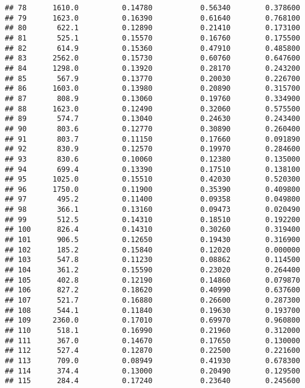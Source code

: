 \documentclass[
]{article}
\begin{document}
\begin{verbatim}
## 78      1610.0          0.14780           0.56340        0.378600
## 79      1623.0          0.16390           0.61640        0.768100
## 80       622.1          0.12890           0.21410        0.173100
## 81       525.1          0.15570           0.16760        0.175500
## 82       614.9          0.15360           0.47910        0.485800
## 83      2562.0          0.15730           0.60760        0.647600
## 84      1298.0          0.13920           0.28170        0.243200
## 85       567.9          0.13770           0.20030        0.226700
## 86      1603.0          0.13980           0.20890        0.315700
## 87       808.9          0.13060           0.19760        0.334900
## 88      1623.0          0.12490           0.32060        0.575500
## 89       574.7          0.13040           0.24630        0.243400
## 90       803.6          0.12770           0.30890        0.260400
## 91       803.7          0.11150           0.17660        0.091890
## 92       830.9          0.12570           0.19970        0.284600
## 93       830.6          0.10060           0.12380        0.135000
## 94       699.4          0.13390           0.17510        0.138100
## 95      1025.0          0.15510           0.42030        0.520300
## 96      1750.0          0.11900           0.35390        0.409800
## 97       495.2          0.11400           0.09358        0.049800
## 98       366.1          0.13160           0.09473        0.020490
## 99       512.5          0.14310           0.18510        0.192200
## 100      826.4          0.14310           0.30260        0.319400
## 101      906.5          0.12650           0.19430        0.316900
## 102      185.2          0.15840           0.12020        0.000000
## 103      547.8          0.11230           0.08862        0.114500
## 104      361.2          0.15590           0.23020        0.264400
## 105      402.8          0.12190           0.14860        0.079870
## 106      827.2          0.18620           0.40990        0.637600
## 107      521.7          0.16880           0.26600        0.287300
## 108      544.1          0.11840           0.19630        0.193700
## 109     2360.0          0.17010           0.69970        0.960800
## 110      518.1          0.16990           0.21960        0.312000
## 111      367.0          0.14670           0.17650        0.130000
## 112      527.4          0.12870           0.22500        0.221600
## 113      709.0          0.08949           0.41930        0.678300
## 114      374.4          0.13000           0.20490        0.129500
## 115      284.4          0.17240           0.23640        0.245600

\end{verbatim}
\end{document}

